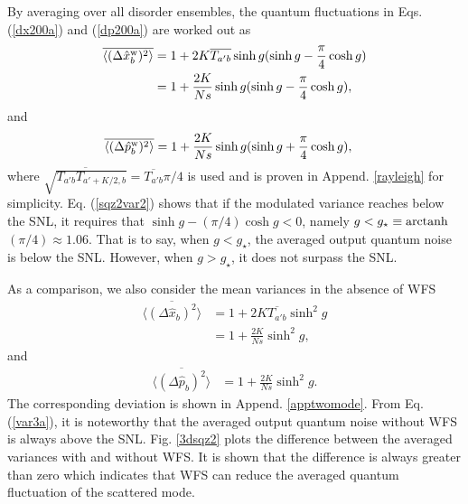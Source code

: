 \documentclass[9pt,twocolumn,twoside]{osajnl}
\begin{document}
By averaging over all disorder ensembles, the quantum fluctuations in Eqs. (\ref{dx200a}) and (\ref{dp200a}) are worked out as
\begin{align}
\label{sqz2var2}
\overline{\langle(\Delta \hat{x}_b^{\rm{w}})^2\rangle} &= 1 + 2K\overline{T_{a'b}} \sinh g ( \sinh g - \frac{\pi}{4} \cosh g)\\ \nonumber
& = 1 + \frac{2K}{Ns} \sinh g ( \sinh g - \frac{\pi}{4} \cosh g),
\end{align}
and
\begin{align}
\overline{\langle(\Delta \hat{p}_b^{\rm{w}})^2\rangle} &=  1 + \frac{2K}{Ns} \sinh g ( \sinh g + \frac{\pi}{4} \cosh g),
\end{align}
where $\overline{\sqrt{T_{a'b} T_{a'+K/2, b}}} = \overline{T_{a'b}} \pi/4$ is used and is proven in Append. \ref{rayleigh} for simplicity. Eq. (\ref{sqz2var2}) shows that if the modulated variance reaches below the SNL, it requires that $\sinh g - (\pi/4)\cosh g  < 0$, namely $ g < g_{\star} \equiv \rm{arctanh}$$( \pi / 4) \approx 1.06 $. That is to say, when $g < g_{\star}$, the averaged output quantum noise is below the SNL. However, when $g >g_{\star}$, it does not surpass the SNL. 


As a comparison, we also consider the mean variances in the absence of WFS
\begin{align}
\label{var3a}
\overline{\langle (\Delta \hat{x}_{b})^2 \rangle} &= 1+ 2 K \overline{T_{a'b}} \sinh^2 g \\ \nonumber
&= 1+ \frac{2 K}{Ns} \sinh^2 g, 
\end{align}
and
\begin{align}
\overline{\langle (\Delta \hat{p}_{b})^2 \rangle} &= 1+ \frac{2 K}{Ns} \sinh^2 g.
\end{align}
The corresponding deviation is shown in Append. \ref{apptwomode}. From Eq. (\ref{var3a}), it is noteworthy that the averaged output quantum noise without WFS is always above the SNL. Fig. \ref{3dsqz2} plots the difference between the averaged variances with and without WFS. It is shown that the difference is always greater than zero which indicates that WFS can reduce the averaged quantum fluctuation of the scattered mode.
\end{document}
